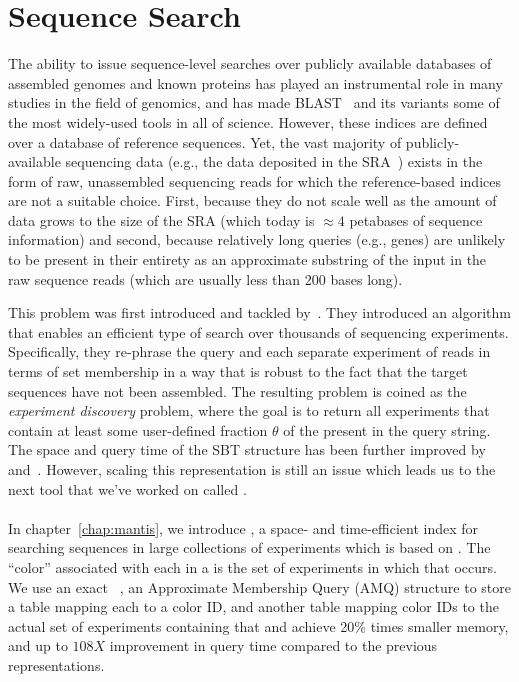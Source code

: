 \section{Sequence Search}
\label{subsec:seqsearch}
The ability to issue sequence-level searches over publicly available databases
of assembled genomes and known proteins has played an instrumental role in many
studies in the field of genomics, and has made BLAST~\citep{Altschul1990BLAST}
and its variants some of the most widely-used tools in all of science.
However, these indices are defined over a database of reference sequences.
Yet, the vast majority of
publicly-available sequencing data (e.g., the data deposited in the
SRA~\citep{Kodama2011sequence}) exists in the form of raw, unassembled
sequencing reads for which the reference-based indices are not
a suitable choice. First, because they do not
scale well as the amount of data grows to the size of the  SRA (which today is
$\approx 4$ petabases of sequence information) and second, because relatively long queries (e.g.,
genes) are unlikely to be present in their entirety as an approximate substring
of the input in the raw sequence reads (which are usually less than 200 bases long).

This problem was first introduced and tackled by~\citet{Solomon2016Fast}.
They introduced an algorithm that enables an
efficient type of search over thousands of sequencing experiments.
Specifically, they re-phrase the query and each separate experiment of reads
in terms of \kmer set membership in a way
that is robust to the fact that the target sequences have not been assembled.
The resulting problem is coined as the \emph{experiment discovery} problem,
where the goal is to return all experiments that contain at least some
user-defined fraction $\theta$ of the \kmers present in the query string.
The space and query time of the SBT structure has been further improved
by~\cite{Solomon2017Improved} and~\cite{Sun2017Allsome}.
However, scaling this representation is still an issue
which leads us to the next tool that we've worked on called \mantis.

\paragraph*{}
In chapter~\ref{chap:mantis}, we introduce \mantis,
a space- and time-efficient index for searching sequences in large
collections of experiments which is based on \cdbgs.
The ``color'' associated with each \kmer
in a \cdbg is the set of experiments in which that \kmer occurs. We
use an exact \cqf~\cite{PandeyBeJo17},
an Approximate Membership Query (AMQ) structure
to store a table mapping each \kmer to a color ID,
and another table mapping color IDs to the actual set of experiments
containing that \kmer and achieve 20$\%$ times smaller memory,
and up to $108X$ improvement in query time compared to the previous representations.

